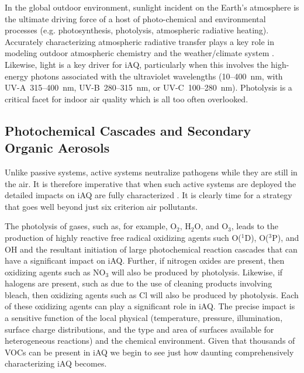 \documentclass[journal=jacsat,manuscript=article]{achemso}
\begin{document}
In the global outdoor environment, sunlight incident on the Earth's atmosphere is the ultimate driving force of a host of photo-chemical and environmental processes (e.g. photosynthesis, photolysis, atmospheric radiative heating). Accurately characterizing atmospheric radiative transfer plays a key role in modeling outdoor atmospheric chemistry and the weather/climate system \cite{Chandrasekhar1960, Lenoble1985, Lary1991a, Lary1991b, Deutschmann:2011, Hartmann:2016, Buehler:2017, Zhang:2019}. Likewise, light is a key driver for iAQ, particularly when this involves the high-energy photons associated with the ultraviolet wavelengths (\hbox{10--400 nm}, with \hbox{UV-A 315--400 nm}, \hbox{UV-B 280--315 nm}, or \hbox{UV-C 100--280 nm}). Photolysis is a critical facet for indoor air quality \citep{carslaw2007} which is all too often overlooked.

\subsection{Photochemical Cascades and Secondary Organic Aerosols}

Unlike passive systems, active systems neutralize pathogens while they are still in the air. It is therefore imperative that when such active systems are deployed the detailed impacts on iAQ are fully characterized \citep{Joo:2021}. It is clearly time for a strategy that goes well beyond just six criterion air pollutants.

The photolysis of gases, such as, for example,  O$_2$, H$_2$O, and O$_3$, leads to the production of highly reactive free radical oxidizing agents such O($^1$D), O($^3$P), and OH and the resultant initiation of large photochemical reaction cascades that can have a significant impact on iAQ. Further, if nitrogen oxides are present, then oxidizing agents such as NO$_3$ will also be produced by photolysis. Likewise, if halogens are present, such as due to the use of cleaning products involving bleach, then oxidizing agents such as Cl will also be produced by photolysis. Each of these oxidizing agents can play a significant role in iAQ. The precise impact is a sensitive function of the local physical (temperature, pressure, illumination, surface charge distributions, and the type and area of surfaces available for heterogeneous reactions) and the chemical environment. Given that thousands of VOCs can be present in iAQ we begin to see just how daunting comprehensively characterizing iAQ becomes.  
\end{document}
